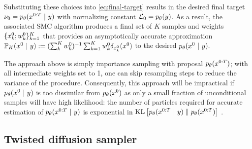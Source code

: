 Substituting these choices into \cref{eq:final-target} results in the desired final target  $\nu_0 = p_{\theta}(x^{0:T}~\vert~ y)$ with normalizing constant $\mathcal{L}_0 = p_{\theta}(y)$. 
As a result, the associated SMC algorithm produces a final set of $K$ samples and weights $\{ x^{0}_k; w^{0}_k\}_{k=1}^K$ that provides an asymptotically accurate approximation $\mathbb{P}_K (x^{0} ~\vert~ y):=(\sum_{k}^K w^0_k)^{-1} \sum_{k=1}^K w^{0}_k \delta_{x^{0}_k}(x^{0})$ to the desired $p_{\theta}(x^{0} ~\vert~ y).$ 

The approach above is simply importance sampling with proposal $p_{\theta} (x^{0:T})$; with all intermediate weights set to 1, one can skip resampling steps to reduce the variance of the procedure.
Consequently, this approach will be impractical if $p_{\theta}(x^{0}~\vert~ y)$ is too dissimilar from $p_{\theta}(x^{0})$
as only a small fraction of unconditional samples will have high likelihood: the number of particles required for accurate estimation of $p_{\theta}(x^{0:T} ~\vert~ y)$ is exponential in $\textrm{KL}\left[p_{\theta}(x^{0:T} ~\vert~ y)\;\|\;p_{\theta} (x^{0:T})\right]$ \citep{chatterjee2018sample}. 

\subsection{Twisted diffusion sampler}\label{subsec:PF_twisted}

